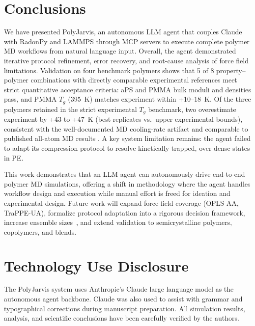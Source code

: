 \documentclass[journal=acsami,manuscript=article]{achemso}
\begin{document}
\section{Conclusions}

We have presented PolyJarvis, an autonomous LLM agent that couples Claude with RadonPy and LAMMPS through MCP servers to execute complete polymer MD workflows from natural language input. Overall, the agent demonstrated iterative protocol refinement, error recovery, and root-cause analysis of force field limitations. Validation on four benchmark polymers shows that 5 of 8 property--polymer combinations with directly comparable experimental references meet strict quantitative acceptance criteria: aPS and PMMA bulk moduli and densities pass, and PMMA $T_g$ (395~K) matches experiment within +10--18~K. Of the three polymers retained in the strict experimental $T_g$ benchmark, two overestimate experiment by +43 to +47~K (best replicates vs.\ upper experimental bounds), consistent with the well-documented MD cooling-rate artifact\cite{soldera2006tg} and comparable to published all-atom MD results \cite{afzal2021highthroughput,suter2025ensemble}. A key system limitation remains: the agent failed to adapt its compression protocol to resolve kinetically trapped, over-dense states in PE.

This work demonstrates that an LLM agent can autonomously drive end-to-end polymer MD simulations, offering a shift in methodology where the agent handles workflow design and execution while manual effort is freed for ideation and experimental design. Future work will expand force field coverage (OPLS-AA, TraPPE-UA), formalize protocol adaptation into a rigorous decision framework, increase ensemble sizes~\cite{suter2025ensemble}, and extend validation to semicrystalline polymers, copolymers, and blends.



\section*{Technology Use Disclosure}
The PolyJarvis system uses Anthropic's Claude large language model as the autonomous agent backbone.
Claude was also used to assist with grammar and typographical corrections during manuscript preparation.
All simulation results, analysis, and scientific conclusions have been carefully verified by the authors.
\end{document}

